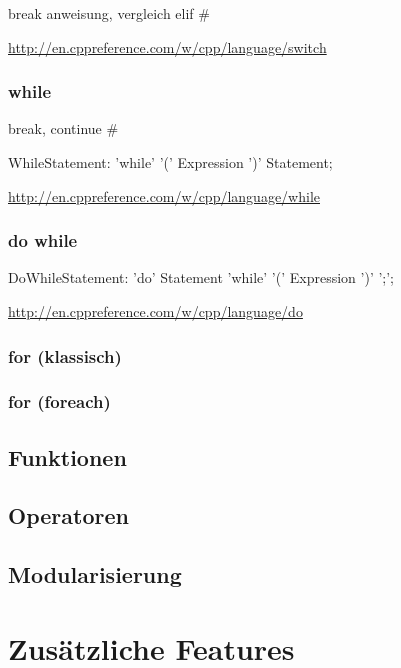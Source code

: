 \documentclass[a4paper]{report}
\begin{document}
break anweisung,
vergleich elif \#%

\url{http://en.cppreference.com/w/cpp/language/switch}

\subsection{while}
break, continue \# %
\begin{rail}
	WhileStatement: 'while' '(' Expression ')' Statement;
\end{rail}

\url{http://en.cppreference.com/w/cpp/language/while}
\subsection{do while}

\begin{rail}
	DoWhileStatement: 'do' Statement 'while' '(' Expression ')' ';';
\end{rail}
\url{http://en.cppreference.com/w/cpp/language/do}

\subsection{for (klassisch)}

\subsection{for (foreach)}


\section{Funktionen}
\section{Operatoren}




\section{Modularisierung}

\chapter{Zusätzliche Features}
\end{document}
